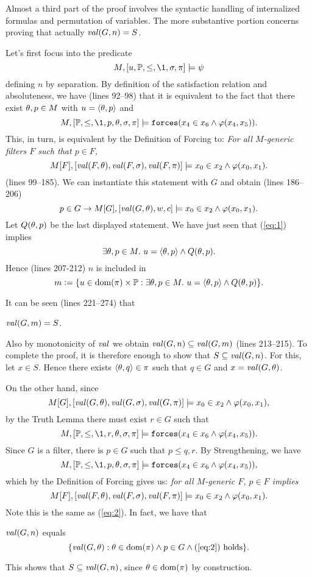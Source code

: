 Almost a third part of the proof involves the syntactic handling of
internalized formulas and permutation of variables. The more
substantive portion concerns proving that actually $\operatorname{\mathit{val}}(G,n)=S$.

Let's first focus into the predicate 
\begin{equation}\label{eq:1}
M,[u,\PP,\leq,\1,\sig,\pi]\models \psi
\end{equation}
defining $n$ by separation. By definition of the satisfaction
relation and %
absoluteness, we have (lines 92--98) that it is equivalent to the fact
that there exist $\theta,p\in M$ with   $u=\langle\theta,p\rangle$  and 
\[
M,[\PP,\leq,\1,p,\th,\sig,\pi]\models \forceisa(x_4\in
x_6\y\phi(x_4,x_5)). 
\]
This, in turn, is equivalent by the Definition of Forcing to: \emph{For all $M$-generic
filters $F$ such that $p\in F$,} 
\begin{equation}\label{eq:2}
M[F],[\val(F,\th),\val(F,\sig),\val(F,\pi)]\models x_0\in
x_2\y\phi(x_0,x_1). 
\end{equation}
(lines 99--185). We can instantiate this statement with $G$ and obtain
(lines 186--206)
\[
p\in G \rightarrow M[G],[\operatorname{\mathit{val}}(G,\theta),w,c]\models x_0\in
x_2\wedge\varphi(x_0,x_1). 
\] 
Let $Q(\theta,p)$ be the last displayed statement. We have just seen that
(\ref{eq:1}) implies 
\[
\exists \theta,p\in M.\ u=\langle\theta,p\rangle \wedge Q(\theta,p).
\]
Hence (lines 207-212) $n$ is included in 
\[
m\mathrel{\mathop:}= \{u \in\operatorname{dom}(\pi)\times\mathbb{P} : \exists \theta,p\in M.\ u=\langle\theta,p\rangle
\wedge Q(\theta,p)\}. 
\]

It can be seen (lines 221--274) that
\begin{lemma}
  $\operatorname{\mathit{val}}(G,m) = S$.
\end{lemma}
Also by monotonicity of $\operatorname{\mathit{val}}$ we obtain 
  $\operatorname{\mathit{val}}(G,n)\subseteq \operatorname{\mathit{val}}(G,m)$ (lines 213--215).
To complete the proof, it is therefore enough to show that
$S\subseteq \operatorname{\mathit{val}}(G,n)$. For this, let $x\in S$. Hence there exists
$\langle\theta,q\rangle\in\pi$ such that 
$q\in G$ and $x=\operatorname{\mathit{val}}(G,\theta)$. 

On the other hand, since 
\[
M[G],[\operatorname{\mathit{val}}(G,\theta),\operatorname{\mathit{val}}(G,\sigma),\operatorname{\mathit{val}}(G,\pi)]\models
 x_0\in x_2\wedge\varphi( x_0, x_1),
\]
by the  Truth Lemma there must exist $r\in G$ such that
\[
M,[\PP,\leq,\1,r,\th,\sig,\pi]\models
\forceisa(x_4\in x_6\y\phi( x_4, x_5)).
\]
Since $G$ is a filter, there is $p\in G$ such that $p\leq q, r$.
By Strengthening, we have
\[
M,[\PP,\leq,\1,p,\th,\sig,\pi]\models
\forceisa(x_4\in x_6\y \phi( x_4, x_5)),
\]
which by the Definition of Forcing gives us: \emph{for all $M$-generic $F$,
  $p\in F$ implies} 
\[
M[F],[\operatorname{\mathit{val}}(F,\theta),\operatorname{\mathit{val}}(F,\sigma),\operatorname{\mathit{val}}(F,\pi)]\models
 x_0\in  x_2 \wedge\varphi( x_0, x_1).
\]
Note this is the same as (\ref{eq:2}). In fact, we have that
\begin{lemma}
  $\operatorname{\mathit{val}}(G,n)$ equals
  \[
  \{\operatorname{\mathit{val}}(G,\theta): \theta\in\operatorname{dom}(\pi) \wedge  p \in G 
  \wedge \text{(\ref{eq:2}) holds}\}.
  \]
\end{lemma}
This shows that $S\subseteq \operatorname{\mathit{val}}(G,n)$, since $\theta\in\operatorname{dom}(\pi)$ by construction. 
   
